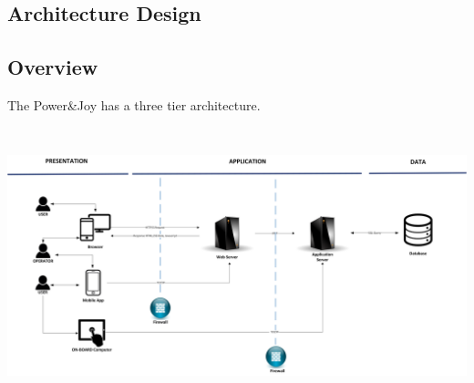 \documentclass{article}
\begin{document}
\begin{flushleft}
\section{Architecture Design}  %
\subsection{Overview}  %
The Power\&Joy has a three tier architecture.
\break

\vspace{0.5cm}
\includegraphics[width=15cm, height=8cm]{architecture} 

\vspace{0.5cm}


\end{flushleft}
\end{document}
